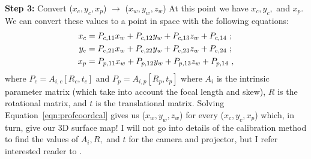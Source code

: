 \noindent
\textbf{Step 3:} Convert ($x_c,y_c,x_p$) $\rightarrow$ ($x_w,y_w,z_w$)
At this point we have $x_c,y_c,$ and $x_p$. We can convert these values to a point in space with the following equations:
\begin{align}
x_c &= P_{c,11}x_w + P_{c,12}y_w + P_{c,13}z_w + P_{c,14} \notag \ ; \\
y_c &= P_{c,21}x_w + P_{c,22}y_w + P_{c,23}z_w + P_{c,24} \notag \ ; \\
x_p &= P_{p,11}x_w + P_{p,12}y_w + P_{p,13}z_w + P_{p,14} \label{eqn:profcoordcal} \ ,
\end{align}
where $P_c=A_{i,c}[R_c,t_c]$ and $P_p=A_{i,p}[R_p,t_p]$ where $A_i$ is the intrinsic parameter matrix (which take into account the focal length and skew), $R$ is the rotational matrix, and $t$ is the translational matrix. Solving Equation~\ref{eqn:profcoordcal} gives us ($x_w,y_w,z_w$) for every ($x_c,y_c,x_p$) which, in turn, give our 3D surface map! I will not go into details of the calibration method to find the values of $A_i,R,$ and $t$ for the camera and projector, but I refer interested reader to \cite{Peng2007,Zhang2010,Gorthi2010,Geng2011}.

